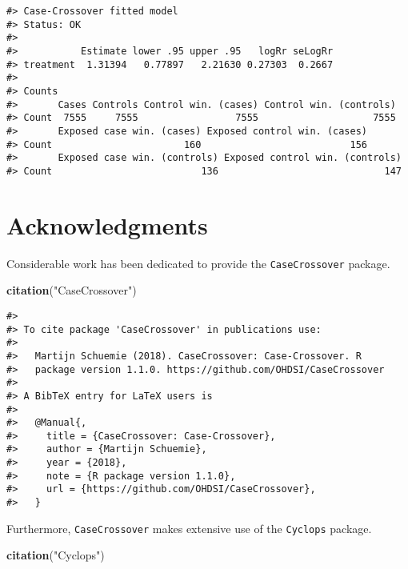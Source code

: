 \documentclass[]{article}
\newenvironment{Shaded}{\begin{snugshade}}{\end{snugshade}}
\newcommand{\KeywordTok}[1]{\textcolor[rgb]{0.13,0.29,0.53}{\textbf{#1}}}
\newcommand{\NormalTok}[1]{#1}
\newcommand{\StringTok}[1]{\textcolor[rgb]{0.31,0.60,0.02}{#1}}
\begin{document}
\begin{verbatim}
#> Case-Crossover fitted model
#> Status: OK
#> 
#>           Estimate lower .95 upper .95   logRr seLogRr
#> treatment  1.31394   0.77897   2.21630 0.27303  0.2667
#> 
#> Counts
#>       Cases Controls Control win. (cases) Control win. (controls)
#> Count  7555     7555                 7555                    7555
#>       Exposed case win. (cases) Exposed control win. (cases)
#> Count                       160                          156
#>       Exposed case win. (controls) Exposed control win. (controls)
#> Count                          136                             147
\end{verbatim}

\hypertarget{acknowledgments}{%
\section{Acknowledgments}\label{acknowledgments}}

Considerable work has been dedicated to provide the
\texttt{CaseCrossover} package.

\begin{Shaded}
\begin{Highlighting}[]
\KeywordTok{citation}\NormalTok{(}\StringTok{"CaseCrossover"}\NormalTok{)}
\end{Highlighting}
\end{Shaded}

\begin{verbatim}
#> 
#> To cite package 'CaseCrossover' in publications use:
#> 
#>   Martijn Schuemie (2018). CaseCrossover: Case-Crossover. R
#>   package version 1.1.0. https://github.com/OHDSI/CaseCrossover
#> 
#> A BibTeX entry for LaTeX users is
#> 
#>   @Manual{,
#>     title = {CaseCrossover: Case-Crossover},
#>     author = {Martijn Schuemie},
#>     year = {2018},
#>     note = {R package version 1.1.0},
#>     url = {https://github.com/OHDSI/CaseCrossover},
#>   }
\end{verbatim}

Furthermore, \texttt{CaseCrossover} makes extensive use of the
\texttt{Cyclops} package.

\begin{Shaded}
\begin{Highlighting}[]
\KeywordTok{citation}\NormalTok{(}\StringTok{"Cyclops"}\NormalTok{)}
\end{Highlighting}
\end{Shaded}
\end{document}
